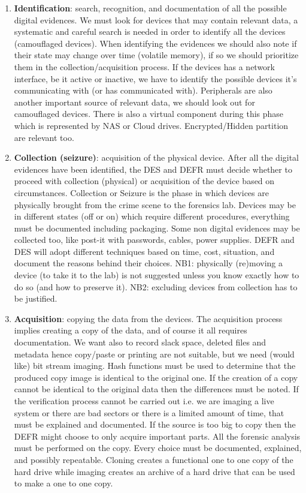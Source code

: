 \documentclass[a4paper, 12pt]{article}
\begin{document}
\begin{enumerate}
    \item \textbf{Identification}: search, recognition, and documentation of all the possible digital evidences. We must look for devices that may contain relevant data, a systematic and careful search is needed in order to identify all the devices (camouflaged devices). When identifying the evidences we should also note if their state may change over time (volatile memory), if so we should prioritize them in the collection/acquisition process. If the devices has a network interface, be it active or inactive, we have to identify the possible devices it's communicating with (or has communicated with). Peripherals are also another important source of relevant data, we should look out for camouflaged devices. There is also a virtual component during this phase which is represented by NAS or Cloud drives. Encrypted/Hidden partition are relevant too.
    \item \textbf{Collection (seizure)}: acquisition of the physical device. After all the digital evidences have been identified, the DES and DEFR must decide whether to proceed with collection (physical) or acquisition of the device based on circumstances. Collection or Seizure is the phase in which devices are physically brought from the crime scene to the forensics lab. Devices may be in different states (off or on) which require different procedures, everything must be documented including packaging. Some non digital evidences may be collected too, like post-it with passwords, cables, power supplies. DEFR and DES will adopt different techniques based on time, cost, situation, and document the reasons behind their choices. NB1: physically (re)moving a device (to take it to the lab) is not suggested unless you know exactly how to do so (and how to preserve it). NB2: excluding devices from collection has to be justified.
    \item \textbf{Acquisition}: copying the data from the devices. The acquisition process implies creating a copy of the data, and of course it all requires documentation. We want also to record slack space, deleted files and metadata hence copy/paste or printing are not suitable, but we need (would like) bit stream imaging. Hash functions must be used to determine that the produced copy image is identical to the original one. If the creation of a copy cannot be identical to the original data then the differences must be noted. If the verification process cannot be carried out i.e. we are imaging a live system or there are bad sectors or there is a limited amount of time, that must be explained and documented. If the source is too big to copy then the DEFR might choose to only acquire important parts. All the forensic analysis must be performed on the copy. Every choice must be documented, explained, and possibly repeatable. Cloning creates a functional one to one copy of the hard drive while imaging creates an archive of a hard drive that can be used to make a one to one copy.

\end{enumerate}
\end{document}
